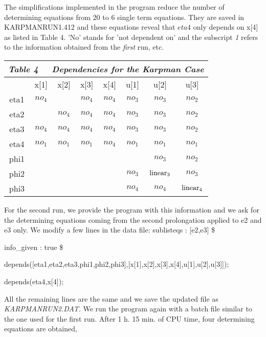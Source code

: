 {\nopagebreak
The simplifications implemented in the program reduce the number of 
determining equations from 20 to 6 single term equations. They are saved in
KARPMANRUN1.412 and these equations reveal that
$eta4$ only depends on x[4] as listed in Table 4.
'No' stands for 'not dependent on' and the subscript {\em 1} refers to the 
information obtained from the {\em first} run, etc.

\nopagebreak
\begin{center}
\begin{tabular}{||c||c|c|c|c|c|c|c||} \hline \hline
\multicolumn{8}{||c||}{\em Table 4 $\;\;\;$ Dependencies for the Karpman Case} 
\\ \hline
     & x[1]   & x[2] &  x[3]   & x[4]    & u[1]   & u[2]   & u[3] \\ \hline 
\hline
eta1 &$no_4$ &       & $no_4$  & $no_4$  & $no_3$ & $no_3$ & $no_2$  \\ \hline
eta2 &       & $no_4$& $no_4$  & $no_4$  & $no_3$ & $no_3$ & $no_2$  \\ \hline
eta3 &$no_4$ & $no_4$& $no_4$  & $no_4$  & $no_3$ & $no_3$ & $no_2$  \\ \hline
eta4 &$no_1$ & $no_1$& $no_1$  & $no_4$  & $no_1$ & $no_1$ & $no_1$  \\ \hline
\hline
phi1 &      &        &         &         &        & $no_3$ & $no_2$  \\ \hline
phi2 &      &        &         &         &$no_3$  &${\rm linear}_3$&$no_3$
\\ \hline
phi3 &      &        &         &         &$no_4$  &$no_4$ & ${\rm linear}_4$
\\ \hline \hline
\end{tabular}
\end{center}
\vskip 2pt
\pagebreak
For the second run, we provide the program with this information and
we ask for the determining equations coming from the
second prolongation applied to e2 and e3 only.
We modify a few lines in the data file: 
\vskip 2pt
sublisteqs : [e2,e3] \$ \par
info\_given : true \$ \par
depends([eta1,eta2,eta3,phi1,phi2,phi3],[x[1],x[2],x[3],x[4],u[1],u[2],u[3]]);
\par
depends(eta4,x[4]); \par
\vskip 2pt
\nopagebreak
\noindent
All the remaining lines are the same and we save the updated file as
{\em KARPMANRUN2.DAT}. We run the program again with a batch
file similar to the one used for the first run.
After 1 h. 15 min. of CPU time, four determining equations are obtained, 
}
